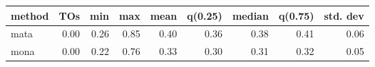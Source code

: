 \begin{tabular}{lrrrrrrrr}
\hline
 method   &   TOs &   min &   max &   mean &   q(0.25) &   median &   q(0.75) &   std. dev \\
\hline
 mata     &  0.00 &  0.26 &  0.85 &   0.40 &      0.36 &     0.38 &      0.41 &       0.06 \\
 mona     &  0.00 &  0.22 &  0.76 &   0.33 &      0.30 &     0.31 &      0.32 &       0.05 \\
\hline
\end{tabular}
